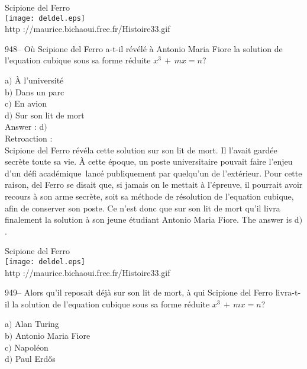 ﻿\documentclass[letterpaper, 12pt]{article}
\begin{document}
        \begin{center}
        Scipione del Ferro\\
    \texttt{[image: deldel.eps]}\\
        {\footnotesize http ://maurice.bichaoui.free.fr/Histoire33.gif}
    \end{center}

948-- O\`u Scipione del Ferro a-t-il r\'ev\'el\'e \`a Antonio Maria
Fiore la solution de l'equation cubique sous sa forme r\'eduite
$x^3\,+\,mx=n$?

a$)$ \`A l'universit\'e \\
b$)$ Dans un parc \\
c$)$ En avion \\
d$)$ Sur son lit de mort\\

Answer : d$)$\\

Retroaction : \\
Scipione del Ferro r\'ev\'ela cette solution sur son lit de mort. Il
l'avait gard\'ee secr\`ete toute sa vie. \`A cette \'epoque, un
poste universitaire pouvait faire l'enjeu d'un \og d\'efi
acad\'emique\fg\ lanc\'e publiquement par quelqu'un de
l'ext\'erieur. Pour cette raison, del Ferro se disait que, si jamais
on le mettait \`a l'\'epreuve, il pourrait avoir recours \`a son
arme secr\`ete, soit sa m\'ethode de r\'esolution de l'equation
cubique, afin de conserver son poste. Ce n'est donc que sur son lit
de mort qu'il livra finalement la solution \`a son jeune
\'etudiant Antonio Maria Fiore. The answer is d$)$.\\

        \begin{center}
        Scipione del Ferro\\
    \texttt{[image: deldel.eps]}\\
        {\footnotesize http ://maurice.bichaoui.free.fr/Histoire33.gif}
    \end{center}

949-- Alors qu'il reposait d\'ej\`a sur son lit de mort, \`a qui
Scipione del Ferro livra-t-il la solution de l'equation cubique
sous sa forme r\'eduite $x^3\,+\,mx=n$?

a$)$ Alan Turing \\
b$)$ Antonio Maria Fiore \\
c$)$ Napol\'eon \\
d$)$ Paul Erd\H{o}s\\
\end{document}
